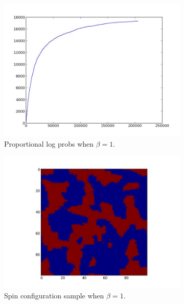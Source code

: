 \begin{figure}
	\begin{subfigure}[b]{.49\textwidth}
		\centering
		\includegraphics[width=\textwidth]{beta1_logprobs.jpeg}
		\caption{Proportional log probs when $\beta = 1$.}
		\label{figur:1}
	\end{subfigure}
	\begin{subfigure}[b]{.49\textwidth}
		\centering
		\includegraphics[width=\textwidth]{beta1_sample.jpeg}
		\caption{Spin configuration sample when $\beta = 1$.}
		\label{figur:2}
	\end{subfigure}
	\begin{subfigure}[b]{.49\textwidth}
		\centering

\end{subfigure}
\end{figure}
